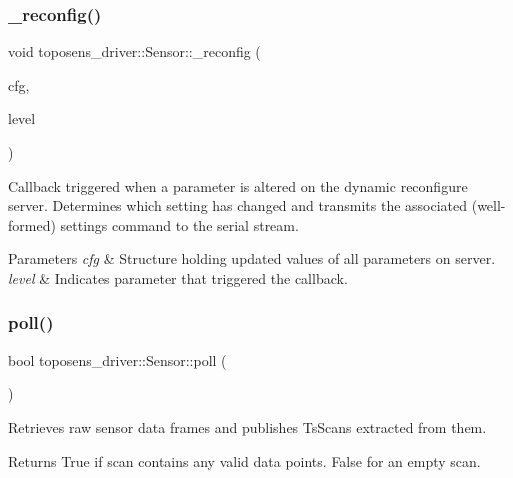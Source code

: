 \subsubsection{\texorpdfstring{\+\_\+reconfig()}{\_reconfig()}}
{\footnotesize\ttfamily void toposens\+\_\+driver\+::\+Sensor\+::\+\_\+reconfig (\begin{DoxyParamCaption}\item[{Ts\+Driver\+Config \&}]{cfg,  }\item[{uint32\+\_\+t}]{level }\end{DoxyParamCaption})\hspace{0.3cm}{\ttfamily [private]}}

Callback triggered when a parameter is altered on the dynamic reconfigure server. Determines which setting has changed and transmits the associated (well-\/formed) settings command to the serial stream. 
\begin{DoxyParams}{Parameters}
{\em cfg} & Structure holding updated values of all parameters on server. \\
\hline
{\em level} & Indicates parameter that triggered the callback. \\
\hline
\end{DoxyParams}
\mbox{\label{classtoposens__driver_1_1Sensor_a926de2fe6169b81fb456d2a8d726cebe}} 
\subsubsection{\texorpdfstring{poll()}{poll()}}
{\footnotesize\ttfamily bool toposens\+\_\+driver\+::\+Sensor\+::poll (\begin{DoxyParamCaption}\item[{void}]{ }\end{DoxyParamCaption})}

Retrieves raw sensor data frames and publishes Ts\+Scans extracted from them. \begin{DoxyReturn}{Returns}
True if scan contains any valid data points. False for an empty scan. 
\end{DoxyReturn}
\mbox{\label{classtoposens__driver_1_1Sensor_a1a568d4c7946731b20c3f81a3c67a566}} 
